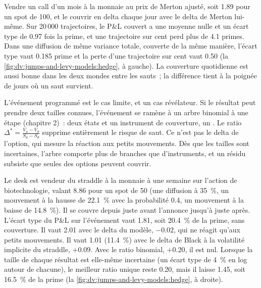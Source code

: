 \begin{example}\label{ex:dv:jumps-and-levy-models:hedge}
Vendre un call d'un mois à la monnaie au prix de Merton ajusté, soit 1.89 pour un spot de 100, et le couvrir en delta chaque jour
avec le delta de Merton lui-même. Sur 20\,000 trajectoires, le P\&L couvert a une moyenne nulle et un écart type de 0.97 fois
la prime, et une trajectoire sur cent perd plus de 4.1 primes. Dans une diffusion de même variance totale,
couverte de la même manière, l'écart type vaut 0.185 prime et la perte d'une trajectoire sur cent vaut 0.50
(la \cref{fig:dv:jumps-and-levy-models:hedge}, à gauche). La couverture quotidienne est aussi bonne dans les deux mondes entre les sauts~; la
différence tient à la poignée de jours où un saut survient.
\end{example}

L'événement programmé est le cas limite, et un cas révélateur. Si le résultat peut prendre deux tailles connues, l'événement se ramène
à un arbre binomial à une étape (chapitre 2)~: deux états et un instrument de couverture, un . Le ratio
$\Delta^*=\frac{V_u-V_d}{S_u-S_d}$ supprime entièrement le risque de saut. Ce n'est pas le delta de l'option, qui mesure
la réaction aux petits mouvements. Dès que les tailles sont incertaines, l'arbre comporte plus de branches que d'instruments, et un
résidu subsiste que seules des options peuvent couvrir.

\begin{example}\label{ex:dv:jumps-and-levy-models:event}
Le desk est vendeur du straddle à la monnaie à une semaine sur l'action de biotechnologie, valant 8.86 pour un spot de 50 (une
diffusion à 35~\%, un mouvement à la hausse de 22.1~\% avec la probabilité 0.4, un mouvement à la baisse de 14.8~\%). Il se couvre depuis juste avant
l'annonce jusqu'à juste après. L'écart type du P\&L sur l'événement vaut 1.81, soit 20.4~\% de
la prime, sans couverture. Il vaut 2.01 avec le delta du modèle, $-0.02$, qui ne réagit qu'aux petits mouvements. Il vaut
1.01 (11.4~\%) avec le delta de Black à la volatilité implicite du straddle, $+0.09$. Avec le ratio binomial,
$+0.20$, il est nul. Lorsque la taille de chaque résultat est elle-même incertaine (un écart type de 4~\% en log autour de chacune),
le meilleur ratio unique reste 0.20, mais il laisse 1.45, soit 16.5~\% de la prime
(la \cref{fig:dv:jumps-and-levy-models:hedge}, à droite).
\end{example}

